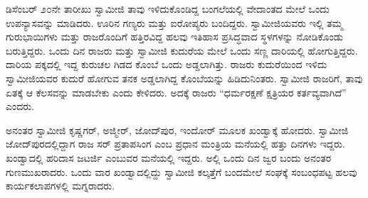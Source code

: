  ಡಿಸೆಂಬರ್ ೨೦ನೇ ತಾರೀಖು ಸ್ವಾಮೀಜಿ ತಾವು ಇಳಿದುಕೊಂಡಿದ್ದ ಬಂಗಲೆಯಲ್ಲಿ ವೇದಾಂತದ ಮೇಲೆ ಒಂದು ಉಪನ್ಯಾಸವನ್ನು ಮಾಡಿದರು. ಊರಿನ ಗಣ್ಯರು ಮತ್ತು ಐರೋಪ್ಯರು ಬಂದಿದ್ದರು. ಸ್ವಾಮೀಜಿಯವರು ಇಲ್ಲಿ ತಮ್ಮ ಗುರುಭಾಯಿಗಳು ಮತ್ತು ರಾಜರೊಂದಿಗೆ ಹತ್ತಿರವಿದ್ದ ಹಲವು ಇತಿಹಾಸ ಪ್ರಸಿದ್ಧವಾದ ಸ್ಥಳಗಳನ್ನು ನೋಡಿಕೊಂಡು ಬರುತ್ತಿದ್ದರು. ಒಂದು ದಿನ ರಾಜರು ಮತ್ತು ಸ್ವಾಮೀಜಿ ಕುದುರೆಯ ಮೇಲೆ ಒಂದು ಸಣ್ಣ ದಾರಿಯಲ್ಲಿ ಹೋಗುತ್ತಿದ್ದರು. ದಾರಿಯ ಪಕ್ಕದಲ್ಲಿ ಇದ್ದ ಕುರುಚಲ ಗಿಡದ ಕೊಂಬೆ ಒಂದು ಅಡ್ಡಲಾಗಿತ್ತು. ರಾಜರು ಕುದುರೆಯಿಂದ ಇಳಿದು ಸ್ವಾಮೀಜಿಯವರ ಕುದುರೆ ಹೋಗುವ ತನಕ ಅಡ್ಡಲಾಗಿದ್ದ ಕೊಂಬೆಯನ್ನು ಹಿಡಿದುನಿಂತರು. ಸ್ವಾಮೀಜಿ ರಾಜರಿಗೆ, ತಾವು ಏತಕ್ಕೆ ಆ ಕೆಲಸವನ್ನು ಮಾಡಬೇಕು ಎಂದು ಕೇಳಿದರು. ಅದಕ್ಕೆ ರಾಜರು “ಧರ್ಮರಕ್ಷಣೆ ಕ್ಷತ್ರಿಯರ ಕರ್ತವ್ಯವಾಗಿದೆ” ಎಂದರು. 

 ಅನಂತರ ಸ್ವಾಮೀಜಿ ಕೃಷ್ಣಗರ್, ಅಜ್ಮೀರ್, ಜೋದ್‍ಪುರ, ಇಂದೋರ್ ಮೂಲಕ ಖಂಡ್ವಾಕ್ಕೆ ಹೋದರು. ಸ್ವಾಮೀಜಿ ಜೋದ್‍ಪುರದಲ್ಲಿದ್ದಾಗ ರಾಜ ಸರ್ ಪ್ರತಾಪಸಿಂಗ ಎಂಬ ಪ್ರಧಾನ ಮಂತ್ರಿಯ ಮನೆಯಲ್ಲಿ ಹತ್ತು ದಿನಗಳು ಇದ್ದರು. ಖಂಡ್ವಾದಲ್ಲಿ ಹರಿದಾಸ ಜಟರ್ಜಿ ಎಂಬುವರ ಮನೆಯಲ್ಲಿ ಇದ್ದರು. ಅಲ್ಲಿ ಒಂದು ದಿನ ಜ್ವರ ಬಂದು ಅನಂತರ ಗುಣಮುಖರಾದರು. ಒಂದು ವಾರ ಖಂಡ್ವಾದಲ್ಲಿದ್ದು ಸ್ವಾಮೀಜಿ ಕಲ್ಕತ್ತೆಗೆ ಬಂದಮೇಲೆ ಸಂಘಕ್ಕೆ ಸಂಬಂಧಪಟ್ಟ ಹಲವು ಕಾರ್ಯಕಲಾಪಗಳಲ್ಲಿ ಮಗ್ನರಾದರು. 


